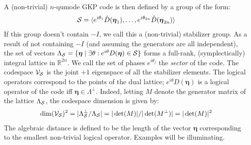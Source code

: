 A (non-trivial) $n$-qumode GKP code is then defined by a group of the form:
\begin{equation}\label{eq:GKP_stabilizer}
    \mathcal{S} = \langle e^{i\theta_1} \hat{D}(\boldsymbol{\eta}_1), \ldots, e^{i\theta_{2n}} \hat{D}(\boldsymbol{\eta}_{2n}) \rangle
\end{equation}
If this group doesn't contain $-I$, we call this a (non-trivial) stabilizer group.
As a result of not containing $-I$ (and assuming the generators are all independent), the set of vectors $\Lambda_{\mathcal{S}} = \{\boldsymbol{\eta} \mid \exists \theta: e^{i\theta}D(\boldsymbol{\eta}) \in \mathcal{S}\}$ forms a full-rank, (symplectically) integral lattice in $\mathbb{R}^{2n}$.
We call the set of phases $e^{i\theta_j}$ the \textit{sector} of the code.
The codespace $\mathcal{V}_{\mathcal{S}}$ is the joint $+1$ eigenspace of all the stabilizer elements.
The logical operators correspond to the points of the dual lattice; $e^{i\theta}D(\boldsymbol{\eta})$ is a logical operator of the code iff $\boldsymbol{\eta} \in \Lambda^\perp$.
Indeed, letting $M$ denote the generator matrix of the lattice $\Lambda_{\mathcal{S}}$, the codespace dimension is given by:
\begin{equation}
    \dim(\mathcal{V}_{\mathcal{S}})^2
    = |\Lambda_{\mathcal{S}}^{\perp} / \Lambda_{\mathcal{S}}|
    = |\det(M)| / |\det(M^\perp)|
    = |\det(M)|^2
\end{equation}
The algebraic distance is defined to be the length of the vector $\boldsymbol{\eta}$ corresponding to the smallest non-trivial logical operator.
Examples will be illuminating.

